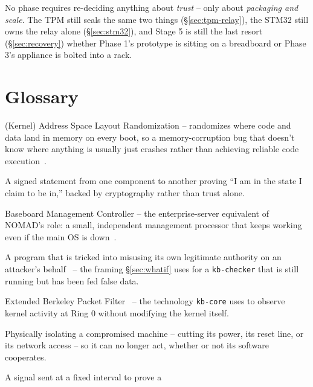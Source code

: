 \documentclass[11pt,a4paper]{article}
\begin{document}
\begin{plainbox}
No phase requires re-deciding anything about \emph{trust} -- only about
\emph{packaging and scale}. The TPM still seals the same two things
(\S\ref{sec:tpm-relay}), the STM32 still owns the relay alone
(\S\ref{sec:stm32}), and Stage 5 is still the last resort
(\S\ref{sec:recovery}) whether Phase 1's prototype is sitting on a
breadboard or Phase 3's appliance is bolted into a rack.
\end{plainbox}

\section{Glossary}

\begin{description}[leftmargin=3.2cm, style=nextline, itemsep=0.35em]
  \item[ASLR/KASLR] (Kernel) Address Space Layout Randomization --
    randomizes where code and data land in memory on every boot, so a
    memory-corruption bug that doesn't know where anything is usually
    just crashes rather than achieving reliable code
    execution~\cite{pax2003}.
  \item[Attestation] A signed statement from one component to another
    proving ``I am in the state I claim to be in,'' backed by
    cryptography rather than trust alone.
  \item[BMC] Baseboard Management Controller -- the enterprise-server
    equivalent of NOMAD's role: a small, independent management processor
    that keeps working even if the main OS is down~\cite{dmtfipmi}.
  \item[Confused Deputy] A program that is tricked into misusing its
    own legitimate authority on an attacker's behalf~\cite{hardy1988}
    -- the framing \S\ref{sec:whatif} uses for a \texttt{kb-checker}
    that is still running but has been fed false data.
  \item[eBPF] Extended Berkeley Packet Filter~\cite{mccanne1993,kernelebpf} -- the technology
    \texttt{kb-core} uses to observe kernel activity at Ring 0 without
    modifying the kernel itself.
  \item[Fencing] Physically isolating a compromised machine -- cutting
    its power, its reset line, or its network access -- so it can no
    longer act, whether or not its software cooperates.
  \item[Heartbeat] A signal sent at a fixed interval to prove a

\end{description}
\end{document}
